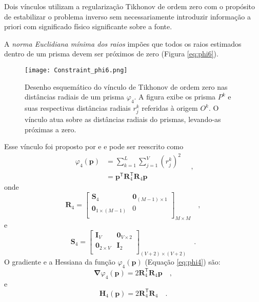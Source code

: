 Dois vínculos utilizam a regularização Tikhonov de ordem zero com o propósito de estabilizar o problema inverso sem necessariamente introduzir informação a priori com significado físico significante sobre a fonte. 

A \textit{norma Euclidiana mínima dos raios} impões que todos os raios estimados dentro de um prisma devem ser próximos de zero (Figura \ref{eq:phi6}).

\begin{figure}[!htb]
	\centering
	\texttt{[image: Constraint\_phi6.png]}
	\caption{Desenho esquemático do vínculo de Tikhonov de ordem zero nas distâncias radiais de um prisma $\varphi_{4}$. A figura exibe os prisma $P^k$ e suas respectivas distâncias radiais $r_j^k$ referidas à origem $O^k$. O vínculo atua sobre as distâncias radiais do prismas, levando-as próximas a zero.}
	\label{fig:phi4}
\end{figure}

Esse vínculo foi proposto por \cite{oliveirajr-etal2011} e \cite{oliveirajr-barbosa2013} e pode ser reescrito como
\begin{equation}\label{eq:phi4}
\begin{split}
\varphi_{4}(\mathbf{p}) &= \sum\limits^{L}_{k=1}\sum\limits^{V}_{j=1}\left(r_{j}^{k}\right)^2 \\
&= \mathbf{p}^{\mathsf{T}} \mathbf{R}_{4}^{\mathsf{T}} \mathbf{R}_{4} \mathbf{p}
\end{split} \quad ,
\end{equation}
onde
\begin{equation}
\mathbf{R}_{4} = 
\begin{bmatrix}
\mathbf{S}_{4} & \mathbf{0}_{(M-1) \times 1} \\
\mathbf{0}_{1 \times (M-1)} & 0 \\
\end{bmatrix}_{M\times M} \quad ,
\label{eq:R4-matrix}
\end{equation}
e
\begin{equation}
\mathbf{S}_{4} = 
\begin{bmatrix}
\mathbf{I}_{V} & \mathbf{0}_{V \times 2} \\
\mathbf{0}_{2 \times V} & \mathbf{I}_{2} \\
\end{bmatrix}_{ (V+2)\times (V+2)} \quad .
\label{eq:S4-matrix}
\end{equation}
O gradiente e a Hessiana da função $\varphi_{4}(\mathbf{p})$ (Equação \ref{eq:phi4}) são:
\begin{equation}\label{eq:phi4_grad}
\boldsymbol{\nabla}\varphi_{4}(\mathbf{p}) = 2 \mathbf{R}_{4}^{\mathsf{T}} \mathbf{R}_{4} \mathbf{p} \quad ,
\end{equation}
e
\begin{equation}\label{eq:phi4_hessian}
\mathbf{H}_{4}(\mathbf{p}) = 2 \mathbf{R}^{\mathsf{T}}_{4}\mathbf{R}_{4} \quad .
\end{equation}


